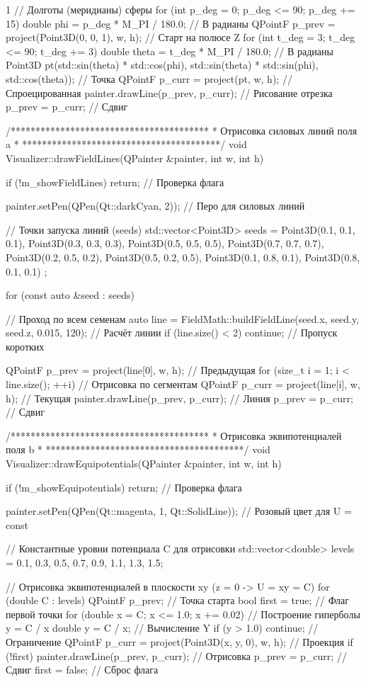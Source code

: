 \begin{listing}{1}
{  // Долготы (меридианы) сферы
  for (int p_deg = 0; p_deg <= 90; p_deg += 15) {
    double phi = p_deg * M_PI / 180.0; // В радианы
    QPointF p_prev = project(Point3D(0, 0, 1), w, h); // Старт на полюсе Z
    for (int t_deg = 3; t_deg <= 90; t_deg += 3) {
      double theta = t_deg * M_PI / 180.0; // В радианы
      Point3D pt(std::sin(theta) * std::cos(phi), std::sin(theta) * std::sin(phi), std::cos(theta)); // Точка
      QPointF p_curr = project(pt, w, h); // Спроецированная
      painter.drawLine(p_prev, p_curr); // Рисование отрезка
      p_prev = p_curr; // Сдвиг
    }
  }
}

/****************************************
* Отрисовка силовых линий поля a        *
****************************************/
void Visualizer::drawFieldLines(QPainter &painter, int w, int h) {
  if (!m_showFieldLines) return; // Проверка флага

  painter.setPen(QPen(Qt::darkCyan, 2)); // Перо для силовых линий

  // Точки запуска линий (seeds)
  std::vector<Point3D> seeds = {
    Point3D(0.1, 0.1, 0.1), Point3D(0.3, 0.3, 0.3),
    Point3D(0.5, 0.5, 0.5), Point3D(0.7, 0.7, 0.7),
    Point3D(0.2, 0.5, 0.2), Point3D(0.5, 0.2, 0.5),
    Point3D(0.1, 0.8, 0.1), Point3D(0.8, 0.1, 0.1)
  };

  for (const auto &seed : seeds) { // Проход по всем семенам
    auto line = FieldMath::buildFieldLine(seed.x, seed.y, seed.z, 0.015, 120); // Расчёт линии
    if (line.size() < 2) continue; // Пропуск коротких

    QPointF p_prev = project(line[0], w, h); // Предыдущая
    for (size_t i = 1; i < line.size(); ++i) { // Отрисовка по сегментам
      QPointF p_curr = project(line[i], w, h); // Текущая
      painter.drawLine(p_prev, p_curr); // Линия
      p_prev = p_curr; // Сдвиг
    }
  }
}

/****************************************
* Отрисовка эквипотенциалей поля b      *
****************************************/
void Visualizer::drawEquipotentials(QPainter &painter, int w, int h) {
  if (!m_showEquipotentials) return; // Проверка флага

  painter.setPen(QPen(Qt::magenta, 1, Qt::SolidLine)); // Розовый цвет для U = const

  // Константные уровни потенциала C для отрисовки
  std::vector<double> levels = {0.1, 0.3, 0.5, 0.7, 0.9, 1.1, 1.3, 1.5};

  // Отрисовка эквипотенциалей в плоскости xy (z = 0 -> U = xy = C)
  for (double C : levels) {
    QPointF p_prev; // Точка старта
    bool first = true; // Флаг первой точки
    for (double x = C; x <= 1.0; x += 0.02) { // Построение гиперболы y = C / x
      double y = C / x; // Вычисление Y
      if (y > 1.0) continue; // Ограничение
      QPointF p_curr = project(Point3D(x, y, 0), w, h); // Проекция
      if (!first) painter.drawLine(p_prev, p_curr); // Отрисовка
      p_prev = p_curr; // Сдвиг
      first = false; // Сброс флага
    }
  }

}
\end{listing}
